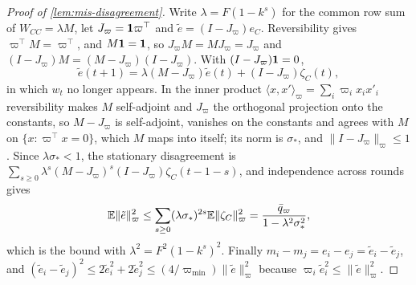 \begin{proof}[Proof of \cref{lem:mis-disagreement}]
Write $\lambda=F(1-k^s)$ for the common row sum of $W_{CC}=\lambda M$, let $J_\varpi=\mathbf{1}\varpi^\top$ and $\tilde e=(I-J_\varpi)e_C$. Reversibility gives $\varpi^\top M=\varpi^\top$, and $M\mathbf{1}=\mathbf{1}$, so $J_\varpi M=MJ_\varpi=J_\varpi$ and $(I-J_\varpi)M=(M-J_\varpi)(I-J_\varpi)$. With $(I-J_\varpi)\mathbf{1}=0$,
\begin{equation*}
\tilde e(t+1)=\lambda(M-J_\varpi)\tilde e(t)+(I-J_\varpi)\zeta_C(t),
\end{equation*}
in which $w_t$ no longer appears. In the inner product $\langle x,x'\rangle_\varpi=\sum_i\varpi_ix_ix'_i$ reversibility makes $M$ self-adjoint and $J_\varpi$ the orthogonal projection onto the constants, so $M-J_\varpi$ is self-adjoint, vanishes on the constants and agrees with $M$ on $\{x:\varpi^\top x=0\}$, which $M$ maps into itself; its norm is $\sigma_\ast$, and $\lVert I-J_\varpi\rVert_\varpi\le1$. Since $\lambda\sigma_\ast<1$, the stationary disagreement is $\sum_{s\ge0}\lambda^s(M-J_\varpi)^s(I-J_\varpi)\zeta_C(t-1-s)$, and independence across rounds gives
\begin{equation*}
\mathbb{E}\lVert\tilde e\rVert_\varpi^2\le\sum_{s\ge0}(\lambda\sigma_\ast)^{2s}\mathbb{E}\lVert\zeta_C\rVert_\varpi^2=\frac{\bar q_\varpi}{1-\lambda^2\sigma_\ast^2},
\end{equation*}
which is the bound with $\lambda^2=F^2(1-k^s)^2$.
Finally $m_i-m_j=e_i-e_j=\tilde e_i-\tilde e_j$, and $(\tilde e_i-\tilde e_j)^2\le2\tilde e_i^2+2\tilde e_j^2\le(4/\varpi_{\min})\lVert\tilde e\rVert_\varpi^2$ because $\varpi_i\tilde e_i^2\le\lVert\tilde e\rVert_\varpi^2$.
\end{proof}

